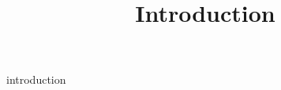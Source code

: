 \documentclass[10pt]{article}
\title{Introduction}
\date{}
\author{}
\begin{document}
\maketitle


{introduction}

% 

\end{document}

